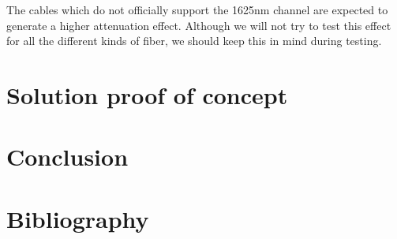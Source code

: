 \documentclass{article}
\begin{document}
The cables which do not officially support the 1625nm channel are expected to generate a higher attenuation effect. Although we will not try to test this effect for all the different kinds of fiber, we should keep this in mind during testing.

\section{Solution proof of concept}

\section{Conclusion}

\section{Bibliography}
\end{document}
